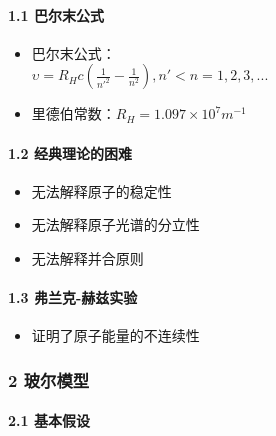 \documentclass[UTF8,twocolumn]{ctexart}
\providecommand{\tightlist}{%
  \setlength{\itemsep}{0pt}\setlength{\parskip}{0pt}}
\let\oldparagraph\paragraph
\renewcommand{\paragraph}[1]{\oldparagraph{#1}\mbox{}}
\begin{document}
\hypertarget{ux5df4ux5c14ux672bux516cux5f0f}{%
\paragraph{{ }1.1 巴尔末公式}\label{ux5df4ux5c14ux672bux516cux5f0f}}

\begin{itemize}
\tightlist
\item
  巴尔末公式：\\\(\upsilon=R_Hc(\frac{1}{n'^2}-\frac{1}{n^2}),n'< n=1,2,3,...\)
\item
  里德伯常数：\(R_H=1.097\times 10^7m^{-1}\)
\end{itemize}

\hypertarget{ux7ecfux5178ux7406ux8bbaux7684ux56f0ux96be}{%
\paragraph{{ }1.2
经典理论的困难}\label{ux7ecfux5178ux7406ux8bbaux7684ux56f0ux96be}}

\begin{itemize}
\tightlist
\item
  无法解释原子的稳定性
\item
  无法解释原子光谱的分立性
\item
  无法解释并合原则
\end{itemize}

\hypertarget{ux5f17ux5170ux514b-ux8d6bux5179ux5b9eux9a8c}{%
\paragraph{{ }1.3
弗兰克-赫兹实验}\label{ux5f17ux5170ux514b-ux8d6bux5179ux5b9eux9a8c}}

\begin{itemize}
\tightlist
\item
  证明了原子能量的不连续性
\end{itemize}

\hypertarget{ux73bbux5c14ux6a21ux578b}{%
\subsubsection{2 玻尔模型}\label{ux73bbux5c14ux6a21ux578b}}

\hypertarget{ux57faux672cux5047ux8bbe}{%
\paragraph{{ }2.1 基本假设}\label{ux57faux672cux5047ux8bbe}}
\end{document}
